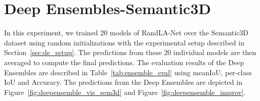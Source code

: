     \section{Deep Ensembles-Semantic3D}
    \label{sec:deepensemble_train}
    In this experiment, we trained 20 models of RandLA-Net over the Semantic3D dataset using random initializations with the experimental setup described in Section~\ref{sec:de_setup}.
    The predictions from these 20 individual models are then averaged to compute the final predictions.
    The evaluation results of the Deep Ensembles are described in Table~\ref{tab:ensemble_eval} using meanIoU, per-class IoU and Accuracy.
    The predictions from the Deep Ensembles are depicted in Figure~\ref{fig:deepensemble_vis_sem3d} and Figure~\ref{fig:deepensemble_improv}.
    \begin{table}[h!]
        \caption{Illustration of performance of RandLA-Net on Semantic3D over ensemble size. meanIOU, IOU per-class and overall accuracy are represented here.
        C1 to C8 are the classes of Semantic3D which are Manmade terrain, Natural terrain, High vegetation, Low vegetation, Buildings, Hardscapes, Scanning artifacts, and Cars.}
        \label{tab:ensemble_eval}
    \end{table} 

